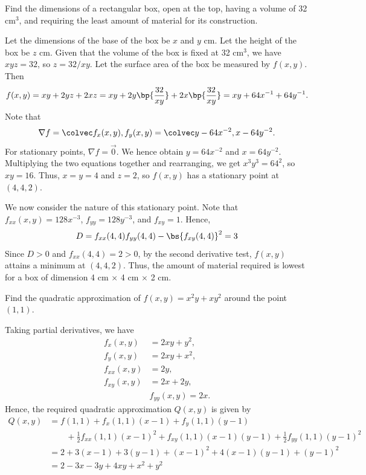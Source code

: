 \begin{problem}
    Find the dimensions of a rectangular box, open at the top, having a volume of 32 cm$^3$, and requiring the least amount of material for its construction.
\end{problem}
\begin{solution}
    Let the dimensions of the base of the box be $x$ and $y$ cm. Let the height of the box be $z$ cm. Given that the volume of the box is fixed at 32 cm$^3$, we have $xyz = 32$, so $z = 32/xy$. Let the surface area of the box be measured by $f(x, y)$. Then \[f(x, y) = xy + 2yz + 2xz = xy + 2y\bp{\frac{32}{xy}} + 2x\bp{\frac{32}{xy}} = xy + 64x^{-1} + 64y^{-1}.\] Note that \[\nabla f = \cvecii{f_x(x, y)}{f_y(x, y)} = \cvecii{y-64x^{-2}}{x - 64y^{-2}}.\] For stationary points, $\nabla f = \vec 0$. We hence obtain $y = 64x^{-2}$ and $x = 64y^{-2}$. Multiplying the two equations together and rearranging, we get $x^3 y^3 = 64^2$, so $xy = 16$. Thus, $x = y = 4$ and $z = 2$, so $f(x, y)$ has a stationary point at $(4, 4, 2)$. 
    
    We now consider the nature of this stationary point. Note that $f_{xx}(x, y) = 128x^{-3}$, $f_{yy} = 128y^{-3}$, and $f_{xy} = 1$. Hence, \[D = f_{xx}(4, 4)f_{yy}(4, 4) - \bs{f_{xy}(4, 4)}^2 = 3\] Since $D > 0$ and $f_{xx}(4, 4) = 2 > 0$, by the second derivative test, $f(x, y)$ attains a minimum at $(4, 4, 2)$. Thus, the amount of material required is lowest for a box of dimension 4 cm $\times$ 4 cm $\times$ 2 cm.
\end{solution}

\begin{problem}
    Find the quadratic approximation of $f(x, y) = x^2 y + xy^2$ around the point $(1, 1)$.
\end{problem}
\begin{solution}
    Taking partial derivatives, we have
    \begin{align*}
        f_x(x, y) &= 2xy + y^2,\\
        f_y(x, y) &= 2xy + x^2,\\
        f_{xx}(x, y) &= 2y,\\
        f_{xy}(x, y) &= 2x + 2y,\\
        &f_{yy}(x, y) = 2x.
    \end{align*}
    Hence, the required quadratic approximation $Q(x, y)$ is given by
    \begin{align*}
        Q(x, y) &= f(1, 1) + f_x(1, 1)(x-1) + f_y(1, 1)(y-1)\\
        & \hspace{2em} + \frac12 f_{xx}(1, 1)(x-1)^2 + f_{xy}(1, 1)(x-1)(y-1) + \frac12 f_{yy}(1, 1)(y-1)^2\\
        &= 2 + 3(x - 1) + 3(y - 1) + (x-1)^2 + 4(x-1)(y-1) + (y-1)^2\\
        &= 2 - 3x - 3y + 4xy + x^2 + y^2
    \end{align*}
\end{solution}